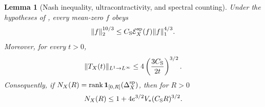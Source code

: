 \documentclass[11pt]{article}
\numberwithin{equation}{section}
\newtheorem{lemma}[lemma]{Lemma}
\theoremstyle{definition}
\theoremstyle{remark}
\newcommand{\one}{\mathbf 1}
\newcommand{\rank}{\operatorname{rank}}
\begin{document}
\begin{lemma}[Nash inequality, ultracontractivity, and spectral counting]
\label{lem:supp-nash-counting}
Under the hypotheses of , every mean-zero $f$ obeys
\begin{equation}
 \|f\|_2^{10/3}
 \le C_{\rm S}\mathcal E_X^{\rm sp}(f)\|f\|_1^{4/3}.
 \label{eq:supp-nash}
\end{equation}
Moreover, for every $t>0$,
\begin{equation}
 \|T_X(t)\|_{L^1\to L^\infty}
 \le4\left(\frac{3C_{\rm S}}{2t}\right)^{3/2}.
 \label{eq:supp-ultracontractive}
\end{equation}
Consequently, if
$N_X(R)=\rank\one_{[0,R]}(\Delta_X^{\rm sp})$, then for $R>0$
\begin{equation}
 N_X(R)\le1+4e^{3/2}V_*(C_{\rm S}R)^{3/2}.
 \label{eq:supp-global-weyl-count}
\end{equation}
\end{lemma}
\end{document}
